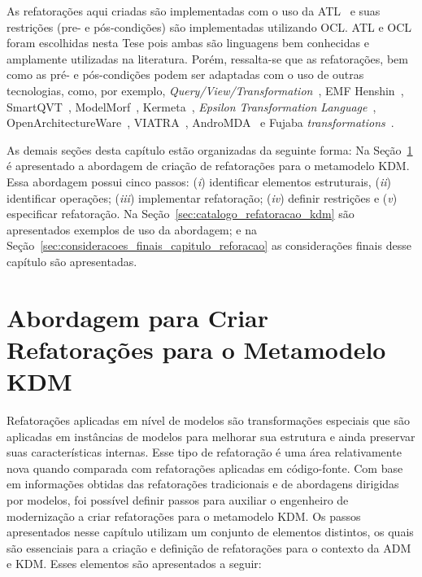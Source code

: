
As refatorações aqui criadas são implementadas com o uso da ATL~\cite{Allilaire_06, Jouault_2005, Jouault_2008} e suas restrições (pre- e pós-condições) são implementadas utilizando OCL. ATL e OCL foram escolhidas nesta Tese pois ambas são linguagens bem conhecidas e amplamente utilizadas na literatura. Porém, ressalta-se que as refatorações, bem como as pré- e pós-condições podem ser adaptadas com o uso de outras tecnologias, como, por exemplo, \textit{Query/View/Transformation}~\cite{QVT:OMG}, EMF Henshin~\cite{EMF_Henshin}, SmartQVT~\cite{SmartQVT}, ModelMorf~\cite{ModelMorf}, Kermeta~\cite{kermeta}, \textit{Epsilon Transformation Language}~\cite{ETL_eclipse}, OpenArchitectureWare~\cite{OpenArchitectureWare}, VIATRA~\cite{viatra}, AndroMDA~\cite{andromda} e Fujaba \textit{transformations}~\cite{fujaba}.

As demais seções desta capítulo estão organizadas da seguinte forma: Na Seção~\ref{sec:estrategiasParaAdaptarRefatoracoesParaOMetamodeloKDM} é apresentado a abordagem de criação de refatorações para o metamodelo KDM. Essa abordagem possui cinco passos: (\textit{i}) identificar elementos estruturais, (\textit{ii}) identificar operações; (\textit{iii}) implementar refatoração; (\textit{iv}) definir restrições e (\textit{v}) especificar refatoração. Na Seção~\ref{sec:catalogo_refatoracao_kdm} são apresentados exemplos de uso da abordagem; e na Seção~\ref{sec:consideracoes_finais_capitulo_reforacao} as considerações finais desse capítulo são apresentadas.


\section{Abordagem para Criar Refatorações para o Metamodelo KDM}\label{sec:estrategiasParaAdaptarRefatoracoesParaOMetamodeloKDM}

Refatorações aplicadas em nível de modelos são transformações especiais que são aplicadas em instâncias de modelos para melhorar sua estrutura e ainda preservar suas características internas. Esse tipo de refatoração é uma área relativamente nova quando comparada com refatorações aplicadas em código-fonte. Com base em informações obtidas das refatorações tradicionais e de abordagens dirigidas por modelos, foi possível definir passos para auxiliar o engenheiro de modernização a criar refatorações para o metamodelo KDM. Os passos apresentados nesse capítulo utilizam um conjunto de elementos distintos, os quais são essenciais para a criação e definição de refatorações para o contexto da ADM e KDM. Esses elementos são apresentados a seguir:

